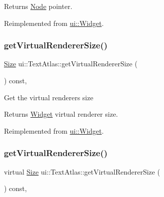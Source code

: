 \begin{DoxyReturn}{Returns}
\hyperlink{classNode}{Node} pointer. 
\end{DoxyReturn}


Reimplemented from \hyperlink{classui_1_1Widget_acf862bf9235fbb3823819eeb65d46f25}{ui\+::\+Widget}.

\mbox{\label{classui_1_1TextAtlas_a3ec9a3a40ad49b44807ef9e42bc6dd2f}} 
\subsubsection{\texorpdfstring{get\+Virtual\+Renderer\+Size()}{getVirtualRendererSize()}\hspace{0.1cm}{\footnotesize\ttfamily [1/2]}}
{\footnotesize\ttfamily \hyperlink{classSize}{Size} ui\+::\+Text\+Atlas\+::get\+Virtual\+Renderer\+Size (\begin{DoxyParamCaption}{ }\end{DoxyParamCaption}) const\hspace{0.3cm}{\ttfamily [override]}, {\ttfamily [virtual]}}

Get the virtual renderer\textquotesingle{}s size \begin{DoxyReturn}{Returns}
\hyperlink{classui_1_1Widget}{Widget} virtual renderer size. 
\end{DoxyReturn}


Reimplemented from \hyperlink{classui_1_1Widget_a2ed0d41565593f78dc59c975d58a869e}{ui\+::\+Widget}.

\mbox{\label{classui_1_1TextAtlas_a844dc4093d63a8ec2d4b6feac6247325}} 
\subsubsection{\texorpdfstring{get\+Virtual\+Renderer\+Size()}{getVirtualRendererSize()}\hspace{0.1cm}{\footnotesize\ttfamily [2/2]}}
{\footnotesize\ttfamily virtual \hyperlink{classSize}{Size} ui\+::\+Text\+Atlas\+::get\+Virtual\+Renderer\+Size (\begin{DoxyParamCaption}{ }\end{DoxyParamCaption}) const\hspace{0.3cm}{\ttfamily [override]}, {\ttfamily [virtual]}}

